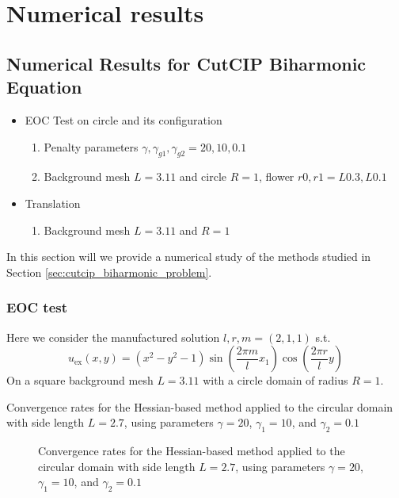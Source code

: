 
\newpage
\section{Numerical results}%
\label{sec:numerical_results}


\subsection{Numerical Results for CutCIP Biharmonic Equation  }%
\label{sub:numerical_results_for_cutcip_biharmonic_equation_}

\begin{itemize}
    \item EOC Test on circle and its configuration
        \begin{enumerate}[label=\arabic*)]
            \item Penalty parameters $\gamma , \gamma _{g1}, \gamma _{g2} = 20,10, 0.1$
            \item Background mesh $L = 3.11$ and circle $R=1$, flower $r0, r1 = L0.3, L0.1$
        \end{enumerate}
    \item Translation
        \begin{enumerate}[label=\arabic*)]
            \item Background mesh $L = 3.11$ and $R=1$
        \end{enumerate}
\end{itemize}


In this section will we provide a numerical study of the methods studied in Section \ref{sec:cutcip_biharmonic_problem}.

\subsubsection{EOC test}%
\label{ssub:eoc_test}

Here we consider the manufactured solution $l,r,m = (2, 1, 1) $ s.t.
\[
u_{\text{ex}}(x,y) = (x^2- y^2 -1) \sin\left(\frac{2\pi m}{l}x_1\right)\cos\left(\frac{2\pi r}{l}y\right)
\]
On a square background mesh $L=3.11$ with a circle domain of radius $R=1$.

\begin{table}


\caption{Convergence rates for the Hessian-based method applied to the circular domain with side length $L=2.7$, using parameters $\gamma=20$, $\gamma_1=10$, and $\gamma_2=0.1$}
\end{table}
\begin{figure}

\caption{Convergence rates for the Hessian-based method applied to the circular domain with side length $L=2.7$, using parameters $\gamma=20$, $\gamma_1=10$, and $\gamma_2=0.1$}
\end{figure}

